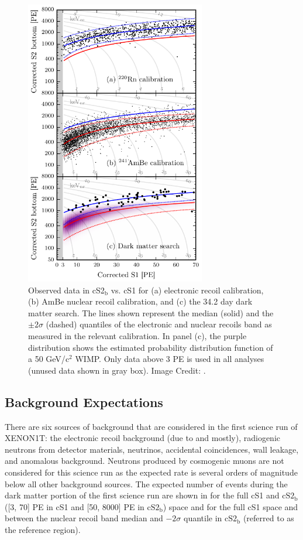 \begin{figure}[p]
	\centering
	\includegraphics[width=0.7\textwidth]{xe1t_data_fsr}
	\caption{ Observed data in cS2$_\textrm{b}$ vs. cS1 for (a)  electronic recoil calibration, (b) AmBe nuclear recoil calibration, and (c) the 34.2 day dark matter search.  The lines shown represent the median (solid) and the $\pm 2 \sigma$ (dashed) quantiles of the electronic and nuclear recoils band as measured in the relevant calibration.  In panel (c), the purple distribution shows the estimated probability distribution function of a 50 GeV/$\textrm{c}^2$ WIMP.  Only data above 3 PE is  used in all analyses (unused data shown in gray box).  Image Credit: .}
	\label{fig:xe1t_data_fsr}
\end{figure}

\subsection{Background Expectations}

There are six sources of background that are considered in the first science run of XENON1T: the electronic recoil background (due to \radon{} and \krypton{} mostly), radiogenic neutrons from detector materials, neutrinos, accidental coincidences, wall leakage, and anomalous background.  Neutrons produced by cosmogenic muons are not considered for this science run as the expected rate is several orders of magnitude below all other background sources.  The expected number of events during the dark matter portion of the first science run are shown in  for the full cS1 and $\textrm{cS2}_{\textrm{b}}$ ([3, 70] PE in cS1 and [50, 8000] PE in $\textrm{cS2}_{\textrm{b}}$) space and for the full cS1 space and between the nuclear recoil band median and $-2\sigma$ quantile in $\textrm{cS2}_{\textrm{b}}$ (referred to as the reference region).

